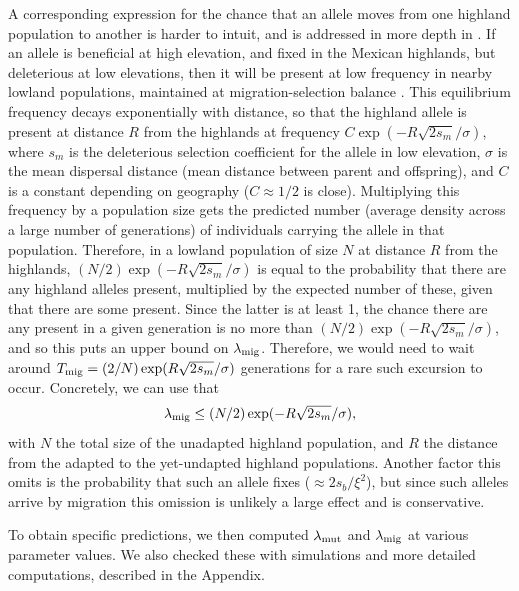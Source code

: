 A corresponding expression for the chance that an allele moves from one highland population to another is harder to intuit,
and is addressed in more depth in \citep{ralphcoop2013patches}.
If an allele is beneficial at high elevation, and fixed in the Mexican highlands,
but deleterious at low elevations,
then it will be present at low frequency in nearby lowland populations,
maintained at migration-selection balance \citep{slatkin1973geneflow}.
This equilibrium frequency decays exponentially with distance,
so that the highland allele is present at distance $R$ from the highlands at frequency $C \exp(- R \sqrt{2s_m} / \sigma)$,
where $s_m$ is the deleterious selection coefficient for the allele in low elevation,
$\sigma$ is the mean dispersal distance (mean distance between parent and offspring),
and $C$ is a constant depending on geography ($C\approx 1/2$ is close).
Multiplying this frequency by a population size gets the predicted number (average density across a large number of generations) of individuals carrying the allele in that population.
Therefore, in a lowland population of size $N$ at distance $R$ from the highlands,
$(N/2)  \exp(- R \sqrt{2s_m} / \sigma)$ is equal to the probability that there are any highland alleles present,
multiplied by the expected number of these, given that there are some present.
Since the latter is at least 1,
the chance there are any present in a given generation is no more than $(N/2) \exp(- R \sqrt{2s_m} / \sigma)$,
and so this puts an upper bound on $\lambda_{\text{mig}}$.
Therefore, we would need to wait around $T_{\text{mig}} = (2/N)\exp(R \sqrt{2s_m} / \sigma)$ generations 
for a rare such excursion to occur.
Concretely, we can use that
\begin{align}
  \lambda_{\text{mig}} \le (N/2)  \exp(- R \sqrt{2s_m} / \sigma) ,
\end{align}
with $N$ the total size of the unadapted highland population,
and $R$ the distance from the adapted to the yet-undapted highland populations.
Another factor this omits is the probability that such an allele fixes ($\approx 2s_b/\xi^2$), but since such alleles arrive by migration this omission is unlikely a large effect and is conservative.

To obtain specific predictions,
we then computed $\lambda_{\text{mut}}$ and $\lambda_{\text{mig}}$ at various parameter values.
We also checked these with simulations and more detailed computations,
described in the Appendix.
